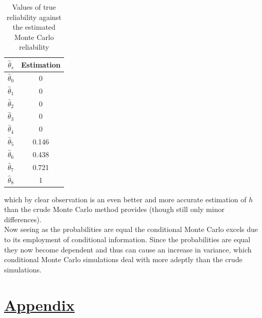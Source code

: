 \documentclass[12pt,
               a4paper,
               article,
               oneside,
               english,oldfontcommands]{memoir}
\begin{document}
\begin{table}[H] 
  \begin{center} 
    \label{tab:con mont prob}
    \begin{tabular}{c c} 
      $\hat{\theta}_s$ & \textbf{Estimation} \\
      \hline
     	$\hat{\theta}_0 $ &  0 \\
     	$\hat{\theta}_1 $ & 0 \\
     	$\hat{\theta}_2 $ & 0 \\
     	$\hat{\theta}_3 $ & 0 \\
     	$\hat{\theta}_4 $ & 0 \\
     	$\hat{\theta}_5 $ & 0.146 \\
     	$\hat{\theta}_6 $ & 0.438 \\
     	$\hat{\theta}_7 $ & 0.721\\
     	$\hat{\theta}_8 $ & 1\\
      \hline 
    \end{tabular}
     \caption{Values of true reliability against the estimated Monte Carlo reliability}
  \end{center}
\end{table}
which by clear observation is an even better and more accurate estimation of $h$ than the crude Monte Carlo method provides (though still only minor differences). \vspace{2mm}\\ 
Now seeing as the probabilities are equal the conditional Monte Carlo excels due to  its employment of conditional information. Since the probabilities are equal they now become dependent and thus can cause an increase in variance, which conditional Monte Carlo simulations deal with more adeptly than the crude simulations.
\section*{\centering \underline{Appendix}}
\end{document}
